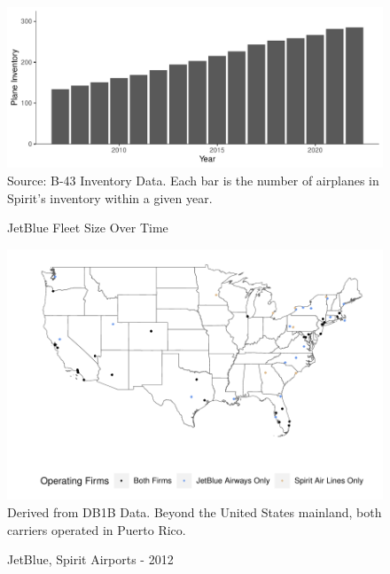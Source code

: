 \documentclass{article}
\begin{document}
\begin{appendices}
\begin{figure}
	\caption{JetBlue Fleet Size Over Time}
	\label{fig:JetBlue_Fleet}
	\includegraphics[width = \linewidth]{JetBlue_Planes.pdf}
	\footnotesize{Source: B-43 Inventory Data. Each bar is the number of airplanes in Spirit's inventory within a given year.}
\end{figure}

\begin{figure}
	\caption{JetBlue, Spirit Airports - 2012}
	\label{fig:JBSpirit_Airports_2012}
	\includegraphics[width = \linewidth]{Map_Mainland_Both_2012.pdf}
	\footnotesize{Derived from DB1B Data. Beyond the United States mainland, both carriers operated in Puerto Rico.}
\end{figure}


\end{appendices}
\end{document}

